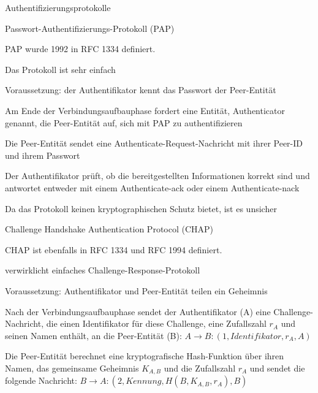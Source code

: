 \documentclass[a4paper]{article}
\begin{document}
\begin{multicols}{3}
      Authentifizierungsprotokolle
      \begin{itemize*}
            \item Passwort-Authentifizierungs-Protokoll (PAP)
            \begin{itemize*}
                  \item PAP wurde 1992 in RFC 1334 definiert.
                  \item Das Protokoll ist sehr einfach
                  \item Voraussetzung: der Authentifikator kennt das Passwort der Peer-Entität
                  \item Am Ende der Verbindungsaufbauphase fordert eine Entität, Authenticator genannt, die Peer-Entität auf, sich mit PAP zu authentifizieren
                  \item Die Peer-Entität sendet eine Authenticate-Request-Nachricht mit ihrer Peer-ID und ihrem Passwort
                  \item Der Authentifikator prüft, ob die bereitgestellten Informationen korrekt sind und antwortet entweder mit einem Authenticate-ack oder einem Authenticate-nack
                  \item Da das Protokoll keinen kryptographischen Schutz bietet, ist es unsicher
            \end{itemize*}
            \item Challenge Handshake Authentication Protocol (CHAP)
            \begin{itemize*}
                  \item CHAP ist ebenfalls in RFC 1334 und RFC 1994 definiert.
                  \item verwirklicht einfaches Challenge-Response-Protokoll
                  \item Voraussetzung: Authentifikator und Peer-Entität teilen ein Geheimnis
                  \item Nach der Verbindungsaufbauphase sendet der Authentifikator (A) eine Challenge-Nachricht, die einen Identifikator für diese Challenge, eine Zufallszahl $r_A$ und seinen Namen enthält, an die Peer-Entität (B): $A \rightarrow B: (1, Identifikator, r_A, A)$
                  \item Die Peer-Entität berechnet eine kryptografische Hash-Funktion über ihren Namen, das gemeinsame Geheimnis $K_{A,B}$ und die Zufallszahl $r_A$ und sendet die folgende Nachricht: $B \rightarrow A: (2, Kennung, H(B, K_{A,B}, r_A), B)$

\end{itemize*}
\end{itemize*}
\end{multicols}
\end{document}
